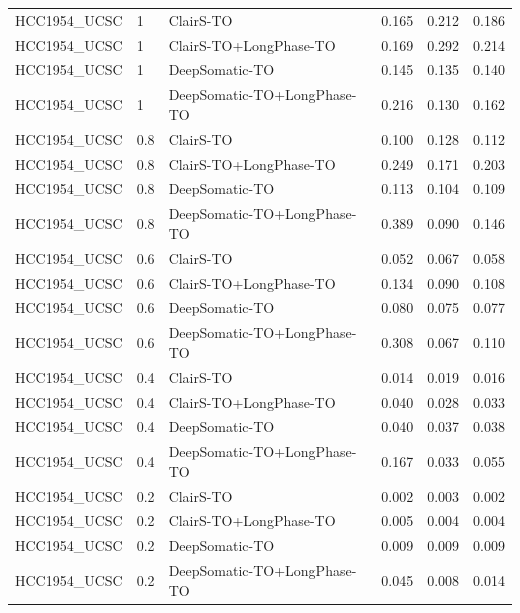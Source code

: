 \documentclass[pdflatex,sn-nature]{sn-jnl}
\begin{document}
{\begin{longtable}{@{}lllccc@{}}
  HCC1954\_UCSC & 1 & ClairS-TO & 0.165 & 0.212 & 0.186 \\
  HCC1954\_UCSC & 1 & ClairS-TO+LongPhase-TO & 0.169 & 0.292 & 0.214 \\
  HCC1954\_UCSC & 1 & DeepSomatic-TO & 0.145 & 0.135 & 0.140 \\
  HCC1954\_UCSC & 1 & DeepSomatic-TO+LongPhase-TO & 0.216 & 0.130 & 0.162 \\
  HCC1954\_UCSC & 0.8 & ClairS-TO & 0.100 & 0.128 & 0.112 \\
  HCC1954\_UCSC & 0.8 & ClairS-TO+LongPhase-TO & 0.249 & 0.171 & 0.203 \\
  HCC1954\_UCSC & 0.8 & DeepSomatic-TO & 0.113 & 0.104 & 0.109 \\
  HCC1954\_UCSC & 0.8 & DeepSomatic-TO+LongPhase-TO & 0.389 & 0.090 & 0.146 \\
  HCC1954\_UCSC & 0.6 & ClairS-TO & 0.052 & 0.067 & 0.058 \\
  HCC1954\_UCSC & 0.6 & ClairS-TO+LongPhase-TO & 0.134 & 0.090 & 0.108 \\
  HCC1954\_UCSC & 0.6 & DeepSomatic-TO & 0.080 & 0.075 & 0.077 \\
  HCC1954\_UCSC & 0.6 & DeepSomatic-TO+LongPhase-TO & 0.308 & 0.067 & 0.110 \\
  HCC1954\_UCSC & 0.4 & ClairS-TO & 0.014 & 0.019 & 0.016 \\
  HCC1954\_UCSC & 0.4 & ClairS-TO+LongPhase-TO & 0.040 & 0.028 & 0.033 \\
  HCC1954\_UCSC & 0.4 & DeepSomatic-TO & 0.040 & 0.037 & 0.038 \\
  HCC1954\_UCSC & 0.4 & DeepSomatic-TO+LongPhase-TO & 0.167 & 0.033 & 0.055 \\
  HCC1954\_UCSC & 0.2 & ClairS-TO & 0.002 & 0.003 & 0.002 \\
  HCC1954\_UCSC & 0.2 & ClairS-TO+LongPhase-TO & 0.005 & 0.004 & 0.004 \\
  HCC1954\_UCSC & 0.2 & DeepSomatic-TO & 0.009 & 0.009 & 0.009 \\
  HCC1954\_UCSC & 0.2 & DeepSomatic-TO+LongPhase-TO & 0.045 & 0.008 & 0.014 \\
\end{longtable}
}
\end{document}
